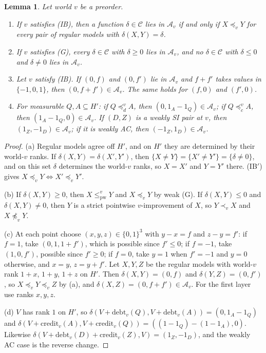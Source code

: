 \documentclass[11pt]{article}
\newtheorem{lemma}[theorem]{Lemma}
\theoremstyle{definition}\newtheorem{definition}[theorem]{Definition}
\theoremstyle{remark}\newtheorem{remark}[theorem]{Remark}
\newcommand{\debt}{\mathrm{debt}}
\newcommand{\cred}{\mathrm{credit}}
\newcommand{\pw}{\mathrm{pw}}
\begin{document}
\begin{lemma}\label{lem:accept}
Let world $v$ be a preorder.
\begin{enumerate}[label=(\alph*),leftmargin=*,itemsep=2pt]
\item If $v$ satisfies (IB), then a function $\delta\in\mathcal C$ lies in
$\mathcal A_v$ if and only if $X\preceq_vY$ for every pair of regular models
with $\delta(X,Y)=\delta$.
\item If $v$ satisfies (G), every $\delta\in\mathcal C$ with $\delta\ge0$
lies in $\mathcal A_v$, and no $\delta\in\mathcal C$ with $\delta\le0$ and
$\delta\ne0$ lies in $\mathcal A_v$.
\item Let $v$ satisfy (IB). If $(0,f)$ and $(0,f')$ lie in $\mathcal A_v$
and $f+f'$ takes values in $\{-1,0,1\}$, then $(0,f+f')\in\mathcal A_v$. The
same holds for $(f,0)$ and $(f',0)$.
\item For measurable $Q,A\subseteq H'$: if $Q\preceq^v_dA$, then
$(0,1_A-1_Q)\in\mathcal A_v$; if $Q\preceq^v_cA$, then
$(1_A-1_Q,0)\in\mathcal A_v$. If $(D,Z)$ is a weakly SI pair at $v$, then
$(1_Z,-1_D)\in\mathcal A_v$; if it is weakly AC, then
$(-1_Z,1_D)\in\mathcal A_v$.
\end{enumerate}
\end{lemma}
\begin{proof}
(a) Regular models agree off $H'$, and on $H'$ they are determined by their
world-$v$ ranks. If $\delta(X,Y)=\delta(X',Y')$, then $\{X\ne Y\}=\{X'\ne
Y'\}=\{\delta\ne0\}$, and on this set $\delta$ determines the world-$v$ ranks,
so $X=X'$ and $Y=Y'$ there. (IB$'$) gives $X\preceq_vY\iff X'\preceq_vY'$.

(b) If $\delta(X,Y)\ge0$, then $X\le^v_\pw Y$ and $X\preceq_vY$ by weak (G).
If $\delta(X,Y)\le0$ and $\delta(X,Y)\ne0$, then $Y$ is a strict pointwise
$v$-improvement of $X$, so $Y\prec_vX$ and $X\not\preceq_vY$.

(c) At each point choose $(x,y,z)\in\{0,1\}^3$ with $y-x=f$ and $z-y=f'$:
if $f=1$, take $(0,1,1+f')$, which is possible since $f'\le0$; if $f=-1$,
take $(1,0,f')$, possible since $f'\ge0$; if $f=0$, take $y=1$ when $f'=-1$
and $y=0$ otherwise, and $x=y$, $z=y+f'$. Let $X,Y,Z$ be the regular models
with world-$v$ rank $1+x$, $1+y$, $1+z$ on $H'$. Then $\delta(X,Y)=(0,f)$
and $\delta(Y,Z)=(0,f')$, so $X\preceq_vY\preceq_vZ$ by (a), and
$\delta(X,Z)=(0,f+f')\in\mathcal A_v$. For the first layer use ranks $x,y,z$.

(d) $V$ has rank $1$ on $H'$, so $\delta(V+\debt_v(Q),V+\debt_v(A))=
(0,1_A-1_Q)$ and $\delta(V+\cred_v(A),V+\cred_v(Q))=((1-1_Q)-(1-1_A),0)$.
Likewise $\delta(V+\debt_v(D)+\cred_v(Z),V)=(1_Z,-1_D)$, and the weakly AC
case is the reverse change.
\end{proof}
\end{document}
